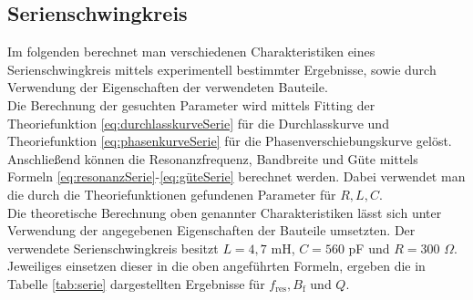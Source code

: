 \documentclass[a4paper,usenatbib]{aspdoc}
\begin{document}
        \subsection{Serienschwingkreis}\label{subsec:result_serie}
            Im folgenden berechnet man verschiedenen Charakteristiken eines Serienschwingkreis mittels experimentell bestimmter Ergebnisse, sowie durch Verwendung der Eigenschaften der verwendeten Bauteile.
            \\
            Die Berechnung der gesuchten Parameter wird mittels Fitting der Theoriefunktion \ref{eq:durchlasskurveSerie} für die Durchlasskurve und Theoriefunktion \ref{eq:phasenkurveSerie} für die Phasenverschiebungskurve gelöst. Anschließend können die Resonanzfrequenz, Bandbreite und Güte mittels Formeln \ref{eq:resonanzSerie}-\ref{eq:güteSerie} berechnet werden. Dabei verwendet man die durch die Theoriefunktionen gefundenen Parameter für $R, L, C$.
            \\
            Die theoretische Berechnung oben genannter Charakteristiken lässt sich unter Verwendung der angegebenen Eigenschaften der Bauteile umsetzten. Der verwendete Serienschwingkreis besitzt $L = 4,7$ mH, $C = 560$ pF und $R = 300$ $\Omega$. Jeweiliges einsetzen dieser in die oben angeführten Formeln, ergeben die in Tabelle \ref{tab:serie} dargestellten Ergebnisse für $f_{\mathrm{res}}, B_{\mathrm{f}}$ und $Q$.
            
\end{document}
